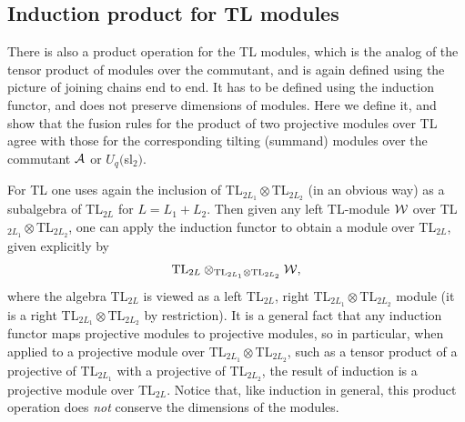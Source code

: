 \documentclass[twocolumn,floats,pra]{revtex4}
\def \cA {{\cal A}}
\newcommand {\be}{\begin{equation}}
\newcommand {\ee} {\end{equation}}
\begin{document}
\subsection{Induction product for TL modules}

There is also a product operation for the TL modules, which is the
analog of the tensor product of modules over the commutant, and is
again defined using the picture of joining chains end to end. It
has to be defined using the induction functor, and does not
preserve dimensions of modules. Here we define it, and show that
the fusion rules for the product of two projective modules over TL
agree with those for the corresponding tilting (summand) modules
over the commutant $\cA$ or $U_q($sl$_2)$.


For TL one uses again the inclusion of
TL$_{2L_1}\otimes$TL$_{2L_2}$ (in an obvious way) as a subalgebra
of TL$_{2L}$ for $L=L_1+L_2$. Then given any left TL-module $\cal
W$ over TL$_{2L_1}\otimes$TL$_{2L_2}$, one can apply the induction
functor to obtain a module over TL$_{2L}$, given explicitly by%
\be%
{\rm TL}_{2L}\otimes_{{\rm TL}_{2L_1}\otimes{\rm TL}_{2L_2}}{\cal
W},\ee%
where the algebra TL$_{2L}$ is viewed as a left TL$_{2L}$, right
TL$_{2L_1}\otimes$TL$_{2L_2}$ module (it is a right
TL$_{2L_1}\otimes$TL$_{2L_2}$ by restriction). It is a general
fact that any induction functor maps projective modules to
projective modules, so in particular, when applied to a projective
module over TL$_{2L_1}\otimes$TL$_{2L_2}$, such as a tensor
product of a projective of TL$_{2L_1}$ with a projective of
TL$_{2L_2}$, the result of induction is a projective module over
TL$_{2L}$. Notice that, like induction in general, this product
operation does {\em not} conserve the dimensions of the modules.
\end{document}
